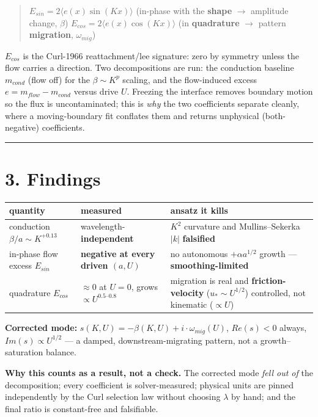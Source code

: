 \documentclass{jfm}
\begin{document}
\begin{quote}
$E_{sin} = 2\langle e(x) \sin(Kx)\rangle $ (in-phase with the \textbf{shape} \ensuremath{\to} amplitude change, $\beta $) $E_{cos} = 2\langle e(x) \cos(Kx)\rangle $ (in \textbf{quadrature} \ensuremath{\to} pattern \textbf{migration}, $\omega _{mig}$)
\end{quote}


$E_{cos}$ is the Curl-1966 reattachment/lee signature: zero by symmetry unless the flow carries a direction. Two decompositions are run: the conduction baseline $m_{cond}$ (flow off) for the $\beta  \sim  K^{p}$ scaling, and the flow-induced excess $e = m_{flow} - m_{cond}$ versus drive $U$. Freezing the interface removes boundary motion so the flux is uncontaminated; this is \emph{why} the two coefficients separate cleanly, where a moving-boundary fit conflates them and returns unphysical (both-negative) coefficients.


\medskip\hrule\medskip


\section*{3. Findings}


\begin{center}\small
\begin{tabularx}{\linewidth}{>{\raggedright\arraybackslash}X>{\raggedright\arraybackslash}X>{\raggedright\arraybackslash}X}
\toprule
quantity & measured & ansatz it kills \\
\midrule
conduction $\beta /a \sim  K^{+0.13}$ & wavelength-\textbf{independent} & $K^{2}$ curvature and Mullins–Sekerka $|k|$ \textbf{falsified} \\
in-phase flow excess $E_{sin}$ & \textbf{negative at every driven $(a,U)$} & no autonomous $+\alpha  a^{1/2}$ growth — \textbf{smoothing-limited} \\
quadrature $E_{cos}$ & $\approx 0$ at $U=0$, grows $\propto  U^{0.5–0.8}$ & migration is real and \textbf{friction-velocity} ($u_*\sim U^{1/2}$) controlled, not kinematic ($\propto U$) \\
\bottomrule
\end{tabularx}
\end{center}


\textbf{Corrected mode:} $s(K,U) = -\beta (K,U) + i\cdot \omega _{mig}(U)$, $Re(s)<0$ always, $Im(s)\propto U^{1/2}$ — a damped, downstream-migrating pattern, not a growth–saturation balance.


\textbf{Why this counts as a result, not a check.} The corrected mode \emph{fell out of} the decomposition; every coefficient is solver-measured; physical units are pinned independently by the Curl selection law without choosing $\lambda $ by hand; and the final ratio is constant-free and falsifiable.
\end{document}

